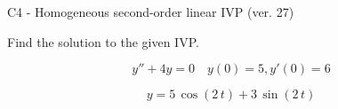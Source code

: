 \begin{exercise}
  \begin{exerciseTitle}C4 - Homogeneous second-order linear IVP (ver. 27)\end{exerciseTitle}
  \begin{exerciseStatement}
    
Find the solution to the given IVP.

    
\[y''+4y = 0 \hspace{1em} y(0) = 5 , y'(0) = 6\]

  \end{exerciseStatement}
  \begin{exerciseAnswer}
    
\[y= 5 \, \cos\left(2 \, t\right) + 3 \, \sin\left(2 \, t\right)\]

  \end{exerciseAnswer}
\end{exercise}
